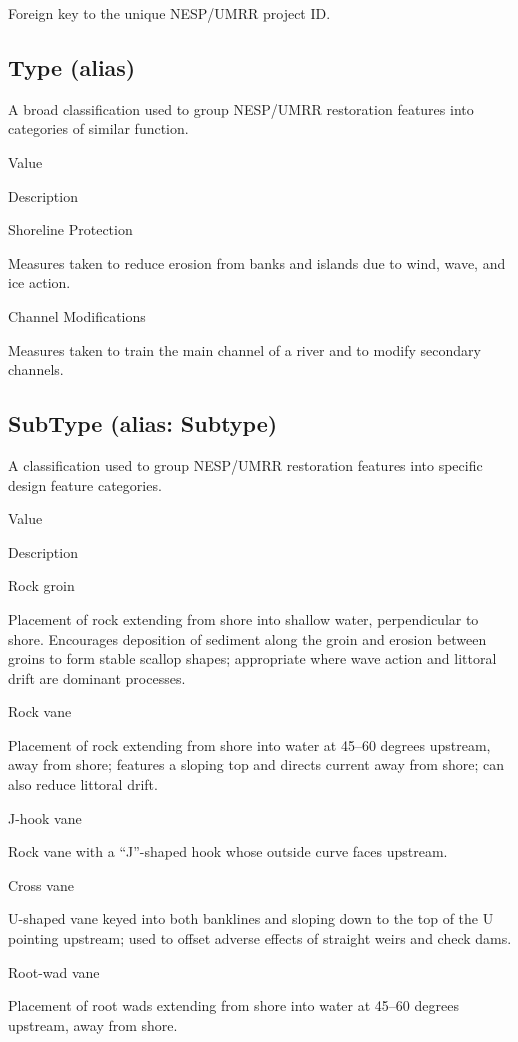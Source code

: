\documentclass[
  letterpaper,
  DIV=11,
  numbers=noendperiod]{scrreprt}
\begin{document}
Foreign key to the unique NESP/UMRR project ID.

\subsection{Type (alias)}\label{type-alias-11}

A broad classification used to group NESP/UMRR restoration features into
categories of similar function.

Value

Description

Shoreline Protection

Measures taken to reduce erosion from banks and islands due to wind,
wave, and ice action.

Channel Modifications

Measures taken to train the main channel of a river and to modify
secondary channels.

\subsection{SubType (alias: Subtype)}\label{subtype-alias-subtype-12}

A classification used to group NESP/UMRR restoration features into
specific design feature categories.

Value

Description

Rock groin

Placement of rock extending from shore into shallow water, perpendicular
to shore. Encourages deposition of sediment along the groin and erosion
between groins to form stable scallop shapes; appropriate where wave
action and littoral drift are dominant processes.

Rock vane

Placement of rock extending from shore into water at 45--60 degrees
upstream, away from shore; features a sloping top and directs current
away from shore; can also reduce littoral drift.

J-hook vane

Rock vane with a ``J''-shaped hook whose outside curve faces upstream.

Cross vane

U-shaped vane keyed into both banklines and sloping down to the top of
the U pointing upstream; used to offset adverse effects of straight
weirs and check dams.

Root-wad vane

Placement of root wads extending from shore into water at 45--60 degrees
upstream, away from shore.
\end{document}
